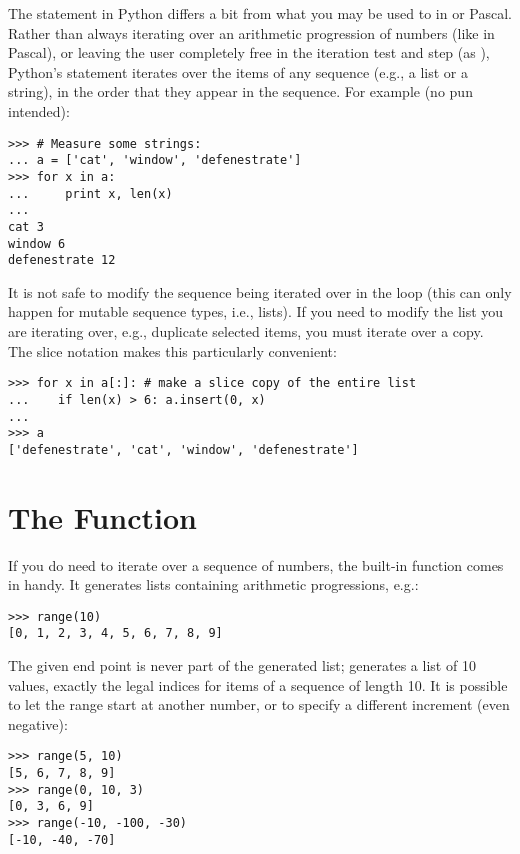 \documentclass{manual}
\begin{document}
The  statement in Python differs a bit from what you may be
used to in \C{} or Pascal.  Rather than always iterating over an
arithmetic progression of numbers (like in Pascal), or leaving the user
completely free in the iteration test and step (as \C{}), Python's
 statement iterates over the items of any sequence (e.g., a
list or a string), in the order that they appear in the sequence.  For 
example (no pun intended):

\begin{verbatim}
>>> # Measure some strings:
... a = ['cat', 'window', 'defenestrate']
>>> for x in a:
...     print x, len(x)
... 
cat 3
window 6
defenestrate 12
\end{verbatim}

It is not safe to modify the sequence being iterated over in the loop
(this can only happen for mutable sequence types, i.e., lists).  If
you need to modify the list you are iterating over, e.g., duplicate
selected items, you must iterate over a copy.  The slice notation
makes this particularly convenient:

\begin{verbatim}
>>> for x in a[:]: # make a slice copy of the entire list
...    if len(x) > 6: a.insert(0, x)
... 
>>> a
['defenestrate', 'cat', 'window', 'defenestrate']
\end{verbatim}

\section{The  Function}
\label{range}

If you do need to iterate over a sequence of numbers, the built-in
function  comes in handy.  It generates lists
containing arithmetic progressions, e.g.:

\begin{verbatim}
>>> range(10)
[0, 1, 2, 3, 4, 5, 6, 7, 8, 9]
\end{verbatim}

The given end point is never part of the generated list;
 generates a list of 10 values, exactly the legal
indices for items of a sequence of length 10.  It is possible to let
the range start at another number, or to specify a different increment
(even negative):

\begin{verbatim}
>>> range(5, 10)
[5, 6, 7, 8, 9]
>>> range(0, 10, 3)
[0, 3, 6, 9]
>>> range(-10, -100, -30)
[-10, -40, -70]
\end{verbatim}
\end{document}
